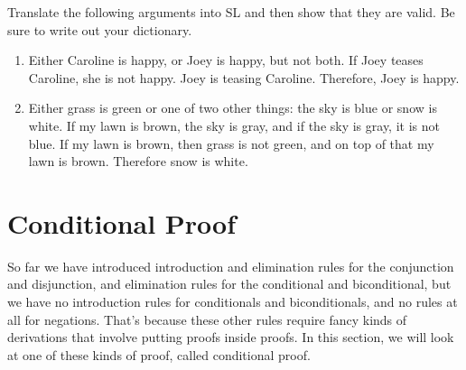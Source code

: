 \noindent\problempart
Translate the following arguments into SL and then show that they are valid. Be sure to write out your dictionary. 
\begin{enumerate}[label=(\arabic*)]

\item Either Caroline is happy, or Joey is happy, but not both. If Joey teases Caroline, she is not happy. Joey is teasing Caroline. Therefore, Joey is happy.

%

\item Either grass is green or one of two other things: the sky is blue or snow is white. If my lawn is brown, the sky is gray, and if the sky is gray, it is not blue. If my lawn is brown, then grass is not green, and on top of that my lawn is brown. Therefore snow is white.

\end{enumerate}

\section{Conditional Proof}
\setlength{\parindent}{1em}

So far we have introduced introduction and elimination rules for the conjunction and disjunction, and elimination rules for the conditional and biconditional, but we have no introduction rules for conditionals and biconditionals, and no rules at all for negations. That's because these other rules require fancy kinds of derivations that involve putting proofs inside proofs. In this section, we will look at one of these kinds of proof, called conditional proof.


